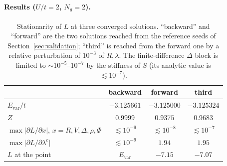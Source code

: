 \documentclass[11pt]{article}
\newcommand{\Ng}{N_{g}}
\begin{document}
\paragraph{Results ($U/t=2$, $\Ng=2$).}
\begin{table}[h]
\centering
\small
\begin{tabular}{lccc}
\toprule
 & backward & forward & third \\
\midrule
$E_{\mathrm{var}}/t$ & $-3.125661$ & $-3.125000$ & $-3.125324$ \\
$Z$ & $0.9999$ & $0.9375$ & $0.9683$ \\
$\max\lvert\partial L/\partial x\rvert$, $x=R,V,\Delta,\rho,\Phi$ & $\lesssim10^{-9}$ & $\lesssim10^{-8}$ & $\lesssim10^{-7}$ \\
$\max\lvert\partial L/\partial\lambda^{c}\rvert$ & $\lesssim10^{-9}$ & $\mathbf{1.94}$ & $\mathbf{1.95}$ \\
$L$ at the point & $E_{\mathrm{var}}$ & $-7.15$ & $-7.07$ \\
\bottomrule
\end{tabular}
\caption{Stationarity of $L$ at three converged solutions. ``backward'' and
``forward'' are the two solutions reached from the reference seeds of
Section~\ref{sec:validation}; ``third'' is reached from the forward one by a
relative perturbation of $10^{-3}$ of $R,\lambda$. The finite-difference $\Delta$
block is limited to $\sim10^{-5}$--$10^{-7}$ by the stiffness of $S$ (its analytic
value is $\lesssim10^{-7}$).}
\label{tab:stationarity}
\end{table}
\end{document}
